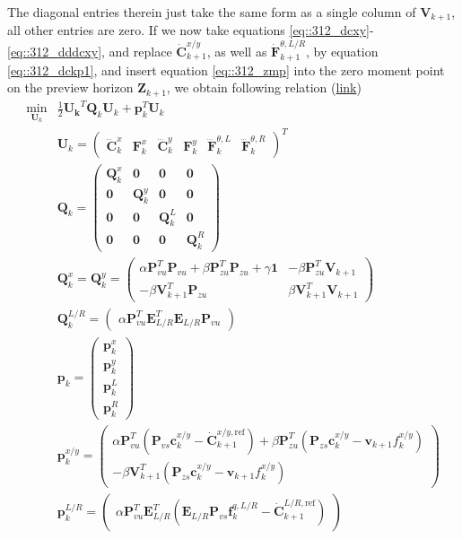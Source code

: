 The diagonal entries therein just take the same form as a single column of $\bm{V}_{k+1}$, all other entries are zero. If we now take equations \ref{eq::312_dcxy}-\ref{eq::312_dddcxy}, and replace $\dot{\bm{C}}_{k+1}^{x/y}$, as well as $\dot{\bm{F}}_{k+1}^{\theta,L/R}$, by equation \ref{eq::312_dckp1}, and insert equation \ref{eq::312_zmp} into the zero moment point on the preview horizon $\bm{Z}_{k+1}$, we obtain following relation (\href{https://github.com/mhubii/nmpc_pattern_generator/blob/5a213044c927dc6aac9f7e32ce1e5fb472cd67bb/libs/pattern_generator/src/nmpc_generator.cpp#L145}{link})
\begin{align}
	\min_{\bm{U}_k} &\frac{1}{2}\bm{U_k}^T\bm{Q}_k\bm{U}_k + \bm{p}_k^T\bm{U}_k
	\label{eq::312_canqp} \\
	& \bm{U}_k = \begin{pmatrix}
	\dddot{\bm{C}}^x_k & \bm{F}_k^x & \dddot{\bm{C}}_k^y & \bm{F}_k^y & \dddot{\bm{F}}_k^{\theta, L} & \dddot{\bm{F}}_k^{\theta, R} 
	\end{pmatrix}^T \\
	&\bm{Q}_k = \begin{pmatrix}
	\bm{Q}_k^{x} & \bm{0} & \bm{0} & \bm{0} \\
	\bm{0} & \bm{Q}_k^{y} & \bm{0} & \bm{0} \\
	\bm{0} & \bm{0} & \bm{Q}_k^L & \bm{0} \\ 
	\bm{0} & \bm{0} & \bm{0} & \bm{Q}_k^R
	\end{pmatrix}\\
	& \bm{Q}_k^x = \bm{Q}_k^y = \begin{pmatrix}
		\alpha\bm{P}_{vu}^T\bm{P}_{vu}+\beta\bm{P}_{zu}^T\bm{P}_{zu}+\gamma\bm{1} & -\beta\bm{P}_{zu}^T\bm{V}_{k+1} \\
		-\beta\bm{V}_{k+1}^T\bm{P}_{zu} & \beta\bm{V}_{k+1}^T\bm{V}_{k+1}
	\end{pmatrix}\\
	& \bm{Q}_k^{L/R} = \begin{pmatrix}
		\alpha\bm{P}_{vu}^T\bm{E}_{L/R}^T\bm{E}_{L/R}\bm{P}_{vu}
	\end{pmatrix}\\
	&\bm{p}_k = \begin{pmatrix}
		\bm{p}_k^x \\
		\bm{p}_k^y \\
		\bm{p}_k^{L} \\
		\bm{p}_k^{R}
	\end{pmatrix} \\
	& \bm{p}_k^{x/y} = \begin{pmatrix}
		\alpha\bm{P}_{vu}^T(\bm{P}_{vs}\bm{c}_k^{x/y}-\dot{\bm{C}}_{k+1}^{x/y,\text{ref}}) + \beta\bm{P}_{zu}^T(\bm{P}_{zs}\bm{c}_k^{x/y}-\bm{v}_{k+1}f_k^{x/y})\\
		-\beta\bm{V}_{k+1}^T(\bm{P}_{zs}\bm{c}_k^{x/y}-\bm{v}_{k+1}f_k^{x/y})
	\end{pmatrix} \\
	& \bm{p}_k^{L/R} = \begin{pmatrix}
		\alpha\bm{P}_{vu}^T\bm{E}_{L/R}^T(\bm{E}_{L/R}\bm{P}_{vs}\bm{f}_k^{q,L/R}-\dot{\bm{C}}_{k+1}^{L/R,\text{ref}})
	\end{pmatrix}
\end{align}
